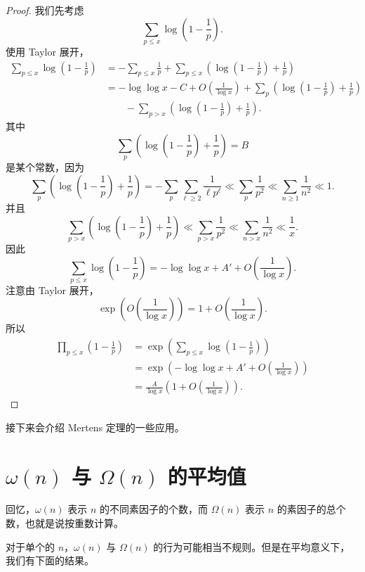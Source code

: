 \begin{proof}
	我们先考虑
	\[
		\sum_{p\leq x}\log\left(1-\frac1p\right).
	\]
	使用 Taylor 展开，
	\[
	\begin{aligned}
		\sum_{p\leq x}\log\left(1-\frac1p\right)
		&=
		-\sum_{p\leq x}\frac1p
		+
		\sum_{p\leq x}
		\left(\log\left(1-\frac1p\right)+\frac1p\right) \\
		&=
		-\log\log x-C+O\left(\frac1{\log x}\right)
		+
		\sum_p
		\left(\log\left(1-\frac1p\right)+\frac1p\right) \\
		&\qquad
		-
		\sum_{p>x}
		\left(\log\left(1-\frac1p\right)+\frac1p\right).
	\end{aligned}
	\]
	其中
	\[
		\sum_p
		\left(\log\left(1-\frac1p\right)+\frac1p\right)=B
	\]
	是某个常数，因为
	\[
		\sum_p
		\left(\log\left(1-\frac1p\right)+\frac1p\right)
		=
		-\sum_p\sum_{\ell\geq 2}\frac1{\ell p^\ell}
		\ll
		\sum_p\frac1{p^2}
		\ll
		\sum_{n\geq 1}\frac1{n^2}
		\ll 1.
	\]
	并且
	\[
		\sum_{p>x}
		\left(\log\left(1-\frac1p\right)+\frac1p\right)
		\ll
		\sum_{p>x}\frac1{p^2}
		\ll
		\sum_{n>x}\frac1{n^2}
		\ll
		\frac1x.
	\]
	因此
	\[
		\sum_{p\leq x}\log\left(1-\frac1p\right)
		=
		-\log\log x+A'
		+
		O\left(\frac1{\log x}\right).
	\]
	注意由 Taylor 展开，
	\[
		\exp\left(O\left(\frac1{\log x}\right)\right)
		=
		1+O\left(\frac1{\log x}\right).
	\]
	所以
	\[
	\begin{aligned}
		\prod_{p\leq x}\left(1-\frac1p\right)
		&=
		\exp\left(\sum_{p\leq x}\log\left(1-\frac1p\right)\right) \\
		&=
		\exp\left(
			-\log\log x+A'
			+
			O\left(\frac1{\log x}\right)
		\right) \\
		&=
		\frac{A}{\log x}
		\left(1+O\left(\frac1{\log x}\right)\right).
	\end{aligned}
	\]
\end{proof}

接下来会介绍 Mertens 定理的一些应用。


\section{\texorpdfstring{\(\omega(n)\) 与 \(\Omega(n)\) 的平均值}{omega(n) 与 Omega(n) 的平均值}}

回忆，$\omega(n)$ 表示 $n$ 的不同素因子的个数，而 $\Omega(n)$ 表示 $n$ 的素因子的总个数，也就是说按重数计算。

对于单个的 $n$，$\omega(n)$ 与 $\Omega(n)$ 的行为可能相当不规则。但是在平均意义下，我们有下面的结果。

